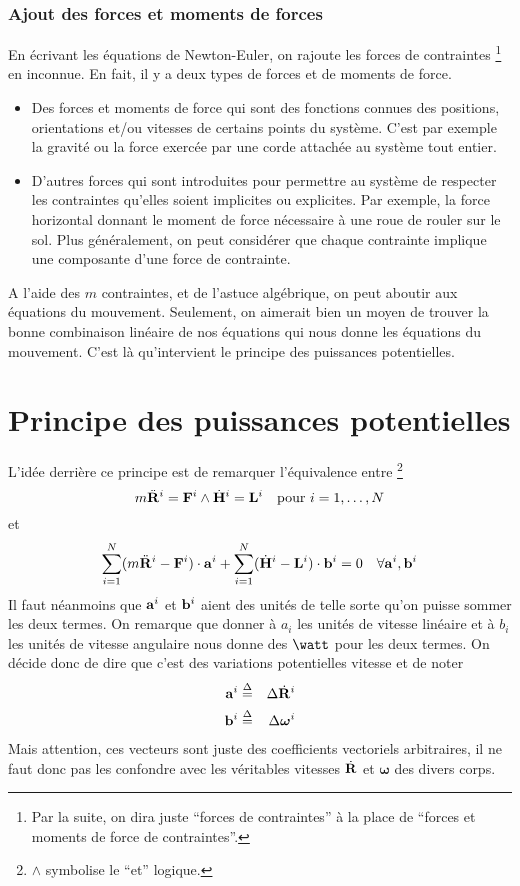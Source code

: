 \documentclass[11pt,a4paper]{article}
\newcommand\fv[1]{{\bf #1}} %
\newcommand\fvd[1]{\dot{\bf #1}} %
\newcommand\fvdd[1]{\ddot{\bf #1}} %
\newcommand\eqdef{\stackrel{\Delta}{=}}
\newcommand\omegaf{{\bm \omega}}
\newcommand\st{{\bf L}}
\newcommand\am{{\bf H}}
\newcommand\amd{\dot{\am}}
\newcommand\xgd{\ensuremath{\fvd{R}}}
\newcommand\xgdd{\ensuremath{\fvdd{R}}}
\begin{document}
\subsubsection{Ajout des forces et moments de forces}
En écrivant les équations de Newton-Euler, on rajoute les forces de contraintes
\footnote{Par la suite, on dira juste ``forces de contraintes'' à la place de ``forces et moments de force de contraintes''.}
en inconnue.
En fait, il y a deux types de forces et de moments de force.
\begin{itemize}
	\item Des forces et moments de force qui sont des fonctions connues des positions, orientations et/ou vitesses de certains points du système.
		C'est par exemple la gravité ou la force exercée par une corde attachée au système tout entier.
	\item D'autres forces qui sont introduites pour permettre au système de respecter les contraintes qu'elles soient implicites ou explicites.
		Par exemple, la force horizontal donnant le moment de force nécessaire à une roue de rouler sur le sol.
		Plus généralement, on peut considérer que chaque contrainte implique une composante d'une force de contrainte.
\end{itemize}

A l'aide des $m$ contraintes, et de l'astuce algébrique, on peut aboutir aux équations du mouvement.
Seulement, on aimerait bien un moyen de trouver la bonne combinaison linéaire de nos équations qui nous donne les équations du mouvement.
C'est là qu'intervient le principe des puissances potentielles.

\section{Principe des puissances potentielles}

L'idée derrière ce principe est de remarquer l'équivalence entre
\footnote{$\land$ symbolise le ``et'' logique.}
\[
m\xgdd^i = \fv{F}^i \land
\amd^i = \st^i
\quad \text{pour } i = 1, \ldots, N
\]
et
\[
\sum_{i=1}^N (m\xgdd^i - \fv{F}^i) \cdot \fv{a}^i +
\sum_{i=1}^N (\amd^i - \st^i) \cdot \fv{b}^i = 0
\quad \forall \fv{a}^i, \fv{b}^i
\]
Il faut néanmoins que $\fv{a}^i$ et $\fv{b}^i$ aient des unités de telle sorte qu'on puisse sommer les deux termes.
On remarque que donner à $a_i$ les unités de vitesse linéaire et à $b_i$ les unités de vitesse angulaire nous donne des $\watt$ pour les deux termes.
On décide donc de dire que c'est des variations potentielles vitesse et de noter
\begin{eqnarray*}
	\fv{a}^i &\eqdef& \Delta \xgd^i\\
	\fv{b}^i &\eqdef& \Delta \omegaf^i
\end{eqnarray*}
Mais attention, ces vecteurs sont juste des coefficients vectoriels arbitraires,
il ne faut donc pas les confondre avec les véritables vitesses $\xgd$ et $\omegaf$ des divers corps.
\end{document}
